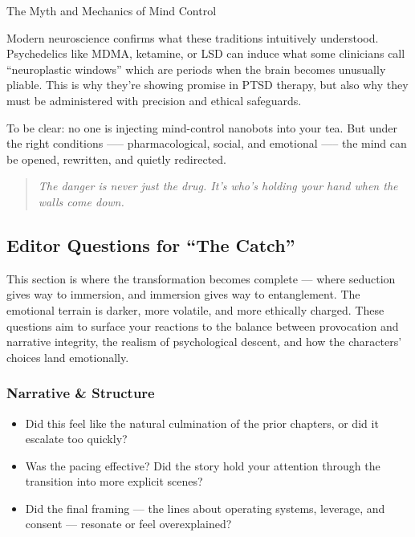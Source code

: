 \begin{PsychologicalSidebar}{The Myth and Mechanics of Mind Control}
  \medskip
  
  Modern neuroscience confirms what these traditions intuitively understood. Psychedelics like MDMA, ketamine, or LSD 
  can induce what some clinicians call “neuroplastic windows” which are periods when the brain becomes unusually 
  pliable. This is why they’re showing promise in PTSD therapy, but also why they must be administered with 
  precision and ethical safeguards. 

  \medskip
  
  To be clear: no one is injecting mind-control nanobots into your tea. But under the right conditions 
  —-- pharmacological, social, and emotional —-- the mind can be opened, rewritten, and quietly 
  redirected.
  
  \begin{quote}
  \textit{The danger is never just the drug. It’s who’s holding your hand when the walls come down.}
  \end{quote}
  
\end{PsychologicalSidebar}

\medskip

\subsection*{Editor Questions for ``The Catch''}

This section is where the transformation becomes complete — where seduction gives way to immersion, and immersion 
gives way to entanglement. The emotional terrain is darker, more volatile, and more ethically charged. These questions 
aim to surface your reactions to the balance between provocation and narrative integrity, the realism of psychological 
descent, and how the characters’ choices land emotionally.

\subsubsection{Narrative \& Structure}

\begin{itemize}
  \item Did this feel like the natural culmination of the prior chapters, or did it escalate too quickly?
  \item Was the pacing effective? Did the story hold your attention through the transition into more explicit scenes?
  \item Did the final framing — the lines about operating systems, leverage, and consent — resonate or feel overexplained?
\end{itemize}

